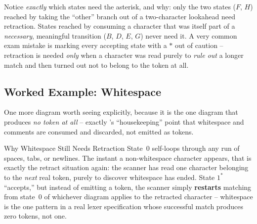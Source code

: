 \documentclass[full-course-notes.tex]{subfiles}
\begin{document}
\begin{examfocus}
Notice \emph{exactly} which states need the asterisk, and why: only the two states ($F$, $H$)
reached by taking the ``other'' branch out of a two-character lookahead need retraction. States
reached by consuming a character that was itself part of a \emph{necessary}, meaningful
transition ($B$, $D$, $E$, $G$) never need it. A very common exam mistake is marking every
accepting state with a $*$ out of caution -- retraction is needed \emph{only} when a character
was read purely to \emph{rule out} a longer match and then turned out not to belong to the
token at all.
\end{examfocus}

\subsection{Worked Example: Whitespace}
\label{sec:l7-diagram-whitespace}

\dbtag One more diagram worth seeing explicitly, because it is the one diagram that produces
\emph{no token at all} -- exactly 's ``housekeeping''
point that whitespace and comments are consumed and discarded, not emitted as tokens.

\begin{center}
\end{center}

\begin{examplebox}{Why Whitespace Still Needs Retraction}
State~0 self-loops through any run of spaces, tabs, or newlines. The instant a non-whitespace
character appears, that is exactly the retract situation again: the scanner has read one
character belonging to the \emph{next} real token, purely to discover whitespace has ended.
State $1^{*}$ ``accepts,'' but instead of emitting a token, the scanner simply \textbf{restarts}
matching from state~0 of whichever diagram applies to the retracted character -- whitespace is
the one pattern in a real lexer specification whose successful match produces zero tokens, not
one.
\end{examplebox}
\end{document}
